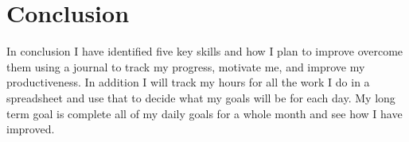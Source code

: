 \documentclass{scrartcl}
\begin{document}
\section*{Conclusion}
In conclusion I have identified five key skills and how I plan to improve overcome them using a journal to track my progress, motivate me, and improve my productiveness. In addition I will track my hours for all the work I do in a spreadsheet and use that to decide what my goals will be for each day. My long term goal is complete all of my daily goals for a whole month and see how I have improved.  




\end{document}
